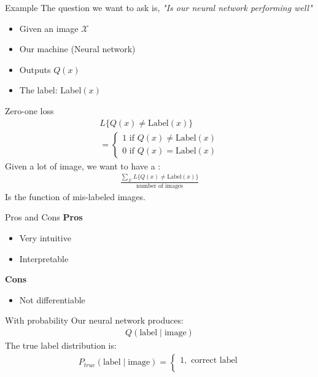 \begin{parag}{Example}
The question we want to ask is, \textit{"Is our neural network performing well"}\\
\begin{itemize}
    \item Given an image $ \mathcal{X}$
    \item Our machine (Neural network)
    \item Outputs $Q(x)$
    \item The label: Label$(x)$
\end{itemize}
\begin{subparag}{Zero-one loss}
    \begin{align*}
        L\{Q(x) \neq \text{Label}(x)\}\\
        = \begin{cases}
            1 \text{ if } Q(x) \neq \text{Label}(x)\\
            0 \text{ if } Q(x) = \text{Label}(x)
        \end{cases}
    \end{align*}
    Given a lot of image, we want to have a :
    \begin{align*}
        \frac{\sum_{ \mathcal{X}} L\{Q(x) \neq \text{Label}(x)\}
}{ \text{number of images}}
    \end{align*}
    Is the function of mis-labeled images.
\end{subparag}
\begin{subparag}{Pros and Cons}
    \textbf{Pros}
    \begin{itemize}
        \item Very intuitive
        \item Interpretable
    \end{itemize}
    \textbf{Cons}
    \begin{itemize}
        \item Not differentiable
    \end{itemize}
\end{subparag}
\begin{subparag}{With probability}
    Our neural network produces:
    \begin{align*}
        Q( \text{label} \mid \text{image})
    \end{align*}
    The true label distribution is:
    \begin{align*}
        P_{true}( \text{label} \mid \text{image}) = \begin{cases}
            1, \text{ correct label}\\

\end{cases}
\end{align*}
\end{subparag}
\end{parag}
